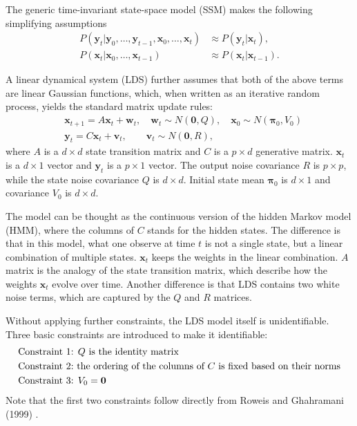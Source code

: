 \documentclass[fleqn,12pt]{article}
\providecommand{\mb}[1]{\boldsymbol{#1}}
\newcommand{\bx}{\mb{x}}
\newcommand{\by}{\mb{y}}
\newcommand{\bX}{\mb{X}}
\newcommand{\bY}{\mb{Y}}
\begin{document}
The generic time-invariant state-space model (SSM) makes the following simplifying assumptions
\begin{equation*}
\begin{aligned}
P(\by_t | \by_0,\ldots,\by_{t-1}, \bx_0,\ldots,\bx_t)  &\approx P(\by_t | \bx_t), \\
P(\bx_t | \bx_0,\ldots,\bx_{t-1}) &\approx P(\bx_t | \bx_{t-1}).
\end{aligned}
\end{equation*}

A linear dynamical system (LDS) further assumes that both of the above terms are linear Gaussian functions, which, when written as an iterative random process, yields the standard matrix update rules:
\begin{equation*}
\begin{aligned}
&\bx_{t+1}=A\bx_t+\mathbf{w}_t, \quad \mathbf{w}_t\sim N(\mathbf{0},Q),\quad \bx_0 \sim N(\mathbf{\pi}_0,V_0)\\
&\by_t=C\bx_t+\mathbf{v}_t,\qquad \mathbf{v}_t\sim N(\mathbf{0},R),
\end{aligned}
\end{equation*}
where $A$ is a $d\times d$ state transition matrix and $C$ is a $p \times d$ generative matrix. $\bx_t$ is a $d\times 1$ vector and $\by_t$ is a $p\times 1$ vector.
The output noise covariance $R$ is $p\times p$, while the state noise covariance $Q$ is $d\times d$. Initial state mean $\mathbf{\pi}_0$ is $d\times 1$ and covariance $V_0$ is $d \times d$.

The model can be thought as the continuous version of the hidden Markov model (HMM), where the columns of $C$ stands for the hidden states. The difference is that in this model, what one observe at time $t$ is not a single state, but a linear combination of multiple states. $\bx_t$ keeps the weights in the linear combination. $A$ matrix is the analogy of the state transition matrix, which describe how the weights $\bx_t$ evolve over time. Another difference is that LDS contains two white noise terms, which are captured by the $Q$ and $R$ matrices.

Without applying further constraints, the LDS model itself is unidentifiable. Three basic constraints are introduced to make it identifiable:
\vspace*{-3mm}
\begin{equation*}\label{eq:constraints1}
\begin{aligned}
&\text{Constraint 1: }Q \text{ is the identity matrix}\\
&\text{\text{Constraint 2:} the ordering of the columns of } C \text{ is fixed based on their norms}\\
&\text{Constraint 3: } V_0=\mathbf{0}
\end{aligned}
\end{equation*}
Note that the first two constraints follow directly from Roweis and Ghahramani (1999) \citep{roweis1999unifying}.
\end{document}
